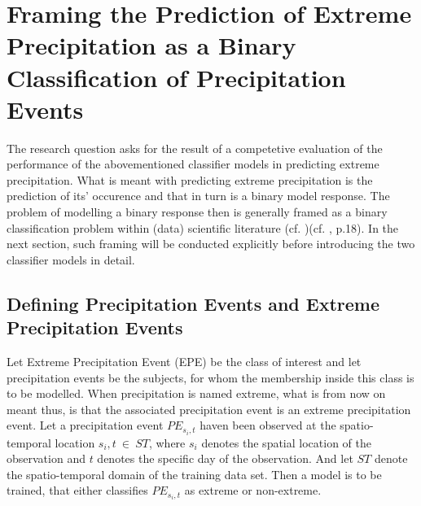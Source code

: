 \documentclass[
  12pt,
]{article}
\begin{document}
\hypertarget{framing-the-prediction-of-extreme-precipitation-as-a-binary-classification-of-precipitation-events}{%
\section{Framing the Prediction of Extreme Precipitation as a Binary
Classification of Precipitation
Events}\label{framing-the-prediction-of-extreme-precipitation-as-a-binary-classification-of-precipitation-events}}

\begingroup
\justify

The research question asks for the result of a competetive evaluation of
the performance of the abovementioned classifier models in predicting
extreme precipitation. What is meant with predicting extreme
precipitation is the prediction of its' occurence and that in turn is a
binary model response. The problem of modelling a binary response then
is generally framed as a binary classification problem within (data)
scientific literature (cf. \citet{Zumel.2014})(cf. \citet{Hosmer.2013},
p.18). In the next section, such framing will be conducted explicitly
before introducing the two classifier models in detail.\newline

\endgroup

\hypertarget{defining-precipitation-events-and-extreme-precipitation-events}{%
\subsection{Defining Precipitation Events and Extreme Precipitation
Events}\label{defining-precipitation-events-and-extreme-precipitation-events}}

\begingroup
\justify
\begin{adjustwidth}{1cm}{0cm}
Let Extreme Precipitation Event (EPE) be the class of interest and let  precipitation events be the subjects, for whom the membership inside this class is to be modelled. When precipitation is named extreme, what is from now on meant thus, is that the associated precipitation event is an extreme precipitation event. Let a precipitation event $PE_{s_{i},t}$ haven been observed at the spatio-temporal location $s_{i},t\:\in\:ST$, where $s_{i}$ denotes the spatial location of the observation and $t$ denotes the specific day of the observation. And let $ST$ denote the spatio-temporal domain of the training data set. Then a model is to be trained, that either classifies $PE_{s_{i},t}$ as extreme or non-extreme.
\end{adjustwidth}
\endgroup
\end{document}
